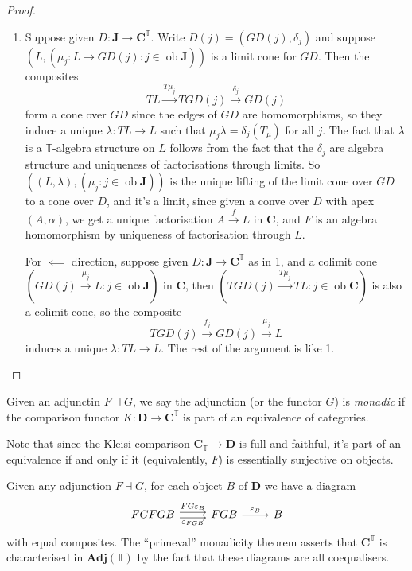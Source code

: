 \documentclass[a4paper]{article}
\renewcommand{\c}[1]{\mathbf{#1}}
\DeclareMathOperator{\ob}{ob}
\newcommand{\adjoint}{\dashv}
\newcommand{\T}{{\mathbb{T}}} %
\begin{document}
\begin{proof}\leavevmode
  \begin{enumerate}
  \item Suppose given \(D: \c J \to \c C^\T\). Write \(D(j) = (GD(j), \delta_j)\) and suppose \((L, (\mu_j: L \to GD(j): j \in \ob \c J))\) is a limit cone for \(GD\). Then the composites
    \[
      TL \xrightarrow{T\mu_j} TGD(j) \xrightarrow{\delta_j} GD(j)
    \]
    form a cone over \(GD\) since the edges of \(GD\) are homomorphisms, so they induce a unique \(\lambda: TL \to L\) such that \(\mu_j \lambda = \delta_j(T_\mu)\) for all \(j\). The fact that \(\lambda\) is a \(\T\)-algebra structure on \(L\) follows from the fact that the \(\delta_j\) are algebra structure and uniqueness of factorisations through limits. So \(((L, \lambda), (\mu_j: j \in \ob \c J))\) is the unique lifting of the limit cone over \(GD\) to a cone over \(D\), and it's a limit, since given a conve over \(D\) with apex \((A, \alpha)\), we get a unique factorisation \(A \xrightarrow{f} L\) in \(\c C\), and \(F\) is an algebra homomorphism by uniqueness of factorisation through \(L\).

    For \(\impliedby\) direction, suppose given \(D: \c J \to \c C^\T\) as in 1, and a colimit cone \((GD(j) \xrightarrow{\mu_j} L: j \in \ob \c J)\) in \(\c C\), then \((TGD(j) \xrightarrow{T\mu_j} TL: j \in \ob \c C)\) is also a colimit cone, so the composite
    \[
      TGD(j) \xrightarrow{f_j} GD(j) \xrightarrow{\mu_j} L
    \]
    induces a unique \(\lambda: TL \to L\). The rest of the argument is like 1.
  \end{enumerate}
\end{proof}

\begin{definition}[monadicity]
  Given an adjunctin \(F \adjoint G\), we say the adjunction (or the functor \(G\)) is \emph{monadic} if the comparison functor \(K: \c D \to \c C^\T\) is part of an equivalence of categories.
\end{definition}

Note that since the Kleisi comparison \(\c C_\T \to \c D\) is full and faithful, it's part of an equivalence if and only if it (equivalently, \(F\)) is essentially surjective on objects.

\begin{remark}
  Given any adjunction \(F \adjoint G\), for each object \(B\) of \(\c D\) we have a diagram
  \[
    \begin{tikzcd}
      FGFGB \ar[r, shift left, "FG\varepsilon_B"] \ar[r, shift right, "\varepsilon_{FGB}"'] & FGB \ar[r, "\varepsilon_B"] & B
    \end{tikzcd}
  \]
  with equal composites. The ``primeval'' monadicity theorem asserts that \(\c C^\T\) is characterised in \(\c{Adj}(\T)\) by the fact that these diagrams are all coequalisers.
\end{remark}
\end{document}
